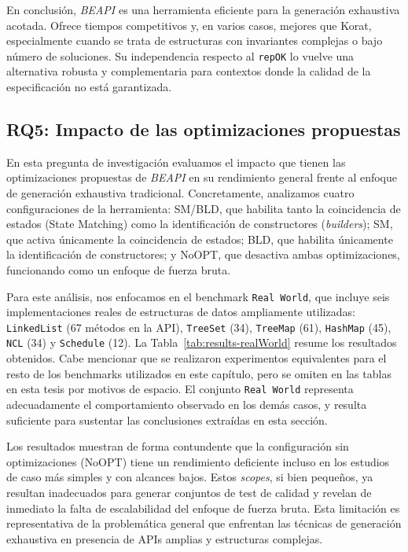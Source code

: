En conclusión, \emph{BEAPI} es una herramienta eficiente para la generación exhaustiva acotada. 
Ofrece tiempos competitivos y, en varios casos, mejores que \textsf{Korat}, especialmente cuando 
se trata de estructuras con invariantes complejas o bajo número de soluciones. Su independencia 
respecto al \texttt{repOK} lo vuelve una alternativa robusta y complementaria para contextos donde 
la calidad de la especificación no está garantizada.


\subsection{RQ5: Impacto de las optimizaciones propuestas}
\label{sec:optimizations}

En esta pregunta de investigación evaluamos el impacto que tienen las optimizaciones propuestas 
de \emph{BEAPI} en su rendimiento general frente al enfoque de generación exhaustiva tradicional. 
Concretamente, analizamos cuatro configuraciones de la herramienta: \textsf{SM/BLD}, que habilita tanto 
la coincidencia de estados (State Matching) como la identificación de constructores (\emph{builders}); 
\textsf{SM}, que activa únicamente la coincidencia de estados; \textsf{BLD}, que habilita únicamente 
la identificación de constructores; y \textsf{NoOPT}, que desactiva ambas optimizaciones, funcionando 
como un enfoque de fuerza bruta.

Para este análisis, nos enfocamos en el benchmark \texttt{Real World}, que incluye seis 
implementaciones reales de estructuras de datos ampliamente utilizadas: \texttt{LinkedList} 
(67 métodos en la API), \texttt{TreeSet} (34), \texttt{TreeMap} (61), \texttt{HashMap} (45), \texttt{NCL} (34) y 
\texttt{Schedule} (12). La Tabla~\ref{tab:results-realWorld} 
resume los resultados obtenidos. Cabe mencionar que se realizaron experimentos equivalentes para 
el resto de los benchmarks utilizados en este capítulo, pero se omiten en las tablas en esta tesis por motivos de espacio.
El conjunto \texttt{Real World} representa adecuadamente el comportamiento observado en los demás casos, 
y resulta suficiente para sustentar las conclusiones extraídas en esta sección.

Los resultados muestran de forma contundente que la configuración sin optimizaciones (\textsf{NoOPT}) 
tiene un rendimiento deficiente incluso en los estudios de caso más simples y con alcances bajos. 
Estos \emph{scopes}, si bien pequeños, ya resultan inadecuados para generar conjuntos de test de 
calidad y revelan de inmediato la falta de escalabilidad del enfoque de fuerza bruta. Esta limitación 
es representativa de la problemática general que enfrentan las técnicas de generación exhaustiva en 
presencia de APIs amplias y estructuras complejas.

